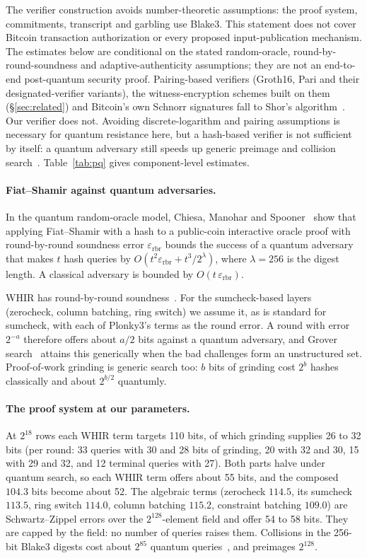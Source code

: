 \documentclass[11pt]{article}
\begin{document}
The verifier construction avoids number-theoretic assumptions: the proof
system, commitments, transcript and garbling use Blake3. This statement does
not cover Bitcoin transaction authorization or every proposed input-publication
mechanism. The estimates below are conditional on the stated random-oracle,
round-by-round-soundness and adaptive-authenticity assumptions; they are not an
end-to-end post-quantum security proof.
Pairing-based verifiers (Groth16, Pari and their designated-verifier variants),
the witness-encryption schemes built on them (\S\ref{sec:related}) and Bitcoin's
own Schnorr signatures fall to Shor's algorithm~\cite{shor94}. Our verifier does
not. Avoiding discrete-logarithm and pairing assumptions is necessary for
quantum resistance here, but a hash-based verifier is not sufficient by
itself: a quantum adversary still speeds up generic preimage and collision
search~\cite{grover96,bht98}. Table~\ref{tab:pq} gives component-level estimates.

\paragraph{Fiat--Shamir against quantum adversaries.} In the quantum random-oracle
model, Chiesa, Manohar and Spooner~\cite{cms19qrom} show that applying
Fiat--Shamir with a hash to a public-coin interactive oracle proof with
round-by-round soundness error $\varepsilon_{\mathrm{rbr}}$ bounds the success
of a quantum adversary that makes $t$ hash queries by
$O(t^2\varepsilon_{\mathrm{rbr}}+t^3/2^{\lambda})$, where $\lambda=256$ is the
digest length. A classical adversary is bounded by
$O(t\,\varepsilon_{\mathrm{rbr}})$.

WHIR has round-by-round soundness~\cite[\S5]{whir25}. For the
sumcheck-based layers (zerocheck, column batching, ring switch) we assume it, as
is standard for sumcheck, with each of Plonky3's terms as the round error. A
round with error $2^{-a}$ therefore offers about $a/2$ bits
against a quantum adversary, and Grover search~\cite{grover96} attains this
generically when the bad challenges form an unstructured set. Proof-of-work
grinding is generic search too: $b$ bits of grinding cost $2^{b}$ hashes
classically and about $2^{b/2}$ quantumly.

\paragraph{The proof system at our parameters.} At $2^{18}$ rows each WHIR term
targets 110 bits, of which grinding supplies 26 to 32 bits (per round: 33
queries with 30 and 28 bits of grinding, 20 with 32 and 30, 15 with 29 and 32, and
12 terminal queries with 27). Both parts halve under quantum search, so each WHIR
term offers about 55 bits, and the composed $104.3$ bits become about 52. The
algebraic terms (zerocheck $114.5$, its sumcheck $113.5$, ring switch $114.0$,
column batching $115.2$, constraint batching $109.0$) are Schwartz--Zippel errors
over the $2^{128}$-element field and offer 54 to 58 bits. They are capped by the
field: no number of queries raises them. Collisions in the 256-bit Blake3
digests cost about $2^{85}$ quantum queries~\cite{bht98}, and preimages
$2^{128}$.
\end{document}
